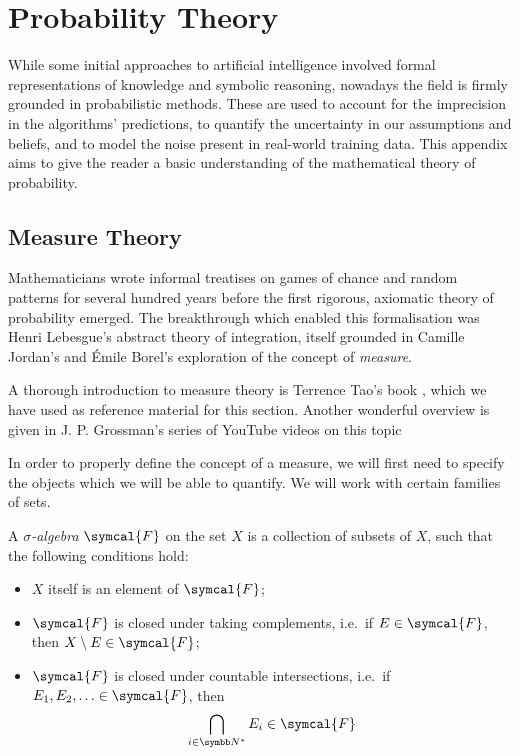 \chapter{Probability Theory}

While some initial approaches to artificial intelligence involved formal representations of knowledge and symbolic reasoning, nowadays the field is firmly grounded in probabilistic methods. These are used to account for the imprecision in the algorithms' predictions, to quantify the uncertainty in our assumptions and beliefs, and to model the noise present in real-world training data. This appendix aims to give the reader a basic understanding of the mathematical theory of probability.



\section{Measure Theory}

Mathematicians wrote informal treatises on games of chance and random patterns for several hundred years before the first rigorous, axiomatic theory of probability emerged. The breakthrough which enabled this formalisation was Henri Lebesgue's abstract theory of integration, itself grounded in Camille Jordan's and Émile Borel's exploration of the concept of \emph{measure}.


A thorough introduction to measure theory is Terrence Tao's book \cite{Tao2011}, which we have used as reference material for this section. Another wonderful overview is given in J. P. Grossman's series of YouTube videos on this topic \cite{BSoM_MeasureTheory}

In order to properly define the concept of a measure, we will first need to specify the objects which we will be able to quantify. We will work with certain families of sets.
 
\begin{definition}
A \emph{\(\sigma\)-algebra} \(\symcal{F}\) on the set \(X\) is a collection of subsets of \(X\), such that the following conditions hold:
\begin{itemize}
    \item \(X\) itself is an element of \(\symcal{F}\);
    \item \(\symcal{F}\) is closed under taking complements, i.e.\ if \(E \in \symcal{F}\), then \(X \setminus E \in \symcal{F}\);
    \item \(\symcal{F}\) is closed under countable intersections, i.e.\ if \(E_1, E_2, \hdots \in \symcal{F}\), then
    \[
        \bigcap_{i \in \naturals^*} E_i \in \symcal{F}
    \]
\end{itemize}
\end{definition}

